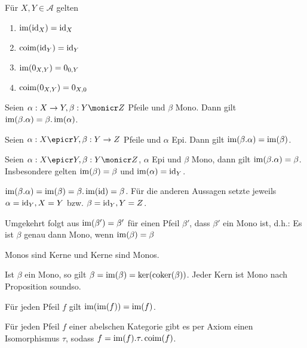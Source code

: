 \begin{prop}
Für $X,Y \in \mathcal A$ gelten
\begin{enumerate}
\item $\operatorname{im}(\operatorname{id}_X) = \operatorname{id}_X$
\item $\operatorname{coim}(\operatorname{id}_Y) = \operatorname{id}_Y$
\item $\operatorname{im}(0_{X,Y}) = 0_{0,Y}$
\item $\operatorname{coim}(0_{X,Y}) = 0_{X,0}$
\end{enumerate}
\end{prop}


\begin{prop}
Seien $\alpha : X \to Y, \beta : Y \monicr Z$ Pfeile und $\beta$ Mono.
Dann gilt $\operatorname{im}(\beta.\alpha) = \beta.\operatorname{im}(\alpha)$.
\end{prop}


\begin{prop}
Seien $\alpha : X \epicr Y, \beta : Y \to Z$ Pfeile und $\alpha$ Epi.
Dann gilt $\operatorname{im}(\beta.\alpha) = \operatorname{im}(\beta)$.
\end{prop}

\begin{korr}
Seien $\alpha : X \epicr Y, \beta : Y \monicr Z$, $\alpha$ Epi und $\beta$ Mono, dann gilt $\operatorname{im}(\beta.\alpha) = \beta$. Insbesondere gelten $\operatorname{im}(\beta) = \beta$ und $\operatorname{im}(\alpha) = \operatorname{id}_Y$.
\end{korr}
\begin{bew}
$\operatorname{im}(\beta.\alpha) = \operatorname{im}(\beta) = \beta.\operatorname{im}(\operatorname{id}) = \beta$. Für die anderen Aussagen setzte jeweils $\alpha = \operatorname{id}_Y, X=Y$ bzw. $\beta = \operatorname{id}_Y, Y=Z$.
\end{bew}
\begin{bem}
Umgekehrt folgt aus $\operatorname{im}(\beta') = \beta'$ für einen Pfeil $\beta'$, dass $\beta'$ ein Mono ist, d.h.:
Es ist $\beta$ genau dann Mono, wenn $\operatorname{im}(\beta) = \beta$
\end{bem}

\begin{korr}
Monos sind Kerne und Kerne sind Monos.
\end{korr}
\begin{bew}
Ist $\beta$ ein Mono, so gilt $\beta = \operatorname{im}(\beta) = \ker(\operatorname{coker}(\beta))$.
Jeder Kern ist Mono nach Proposition soundso.
\end{bew}

\begin{korr}
Für jeden Pfeil $f$ gilt $\operatorname{im}(\operatorname{im}(f)) = \operatorname{im}(f)$.
\end{korr}

\begin{bem}
Für jeden Pfeil $f$ einer abelschen Kategorie gibt es per Axiom einen Isomorphismus $\tau$, sodass $f = \operatorname{im}(f).\tau.\operatorname{coim}(f)$.
\end{bem}
